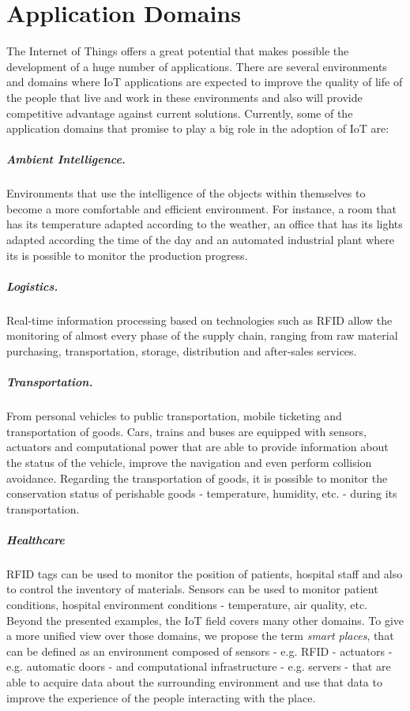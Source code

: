 \section{Application Domains}
\label{sec:application_domains}
The Internet of Things offers a great potential that makes possible the development of a huge number
of applications. There are several environments and domains where \gls{IoT} applications are expected
to improve the quality of life of the people that live and work in these environments and also
will provide competitive advantage against current solutions. Currently, some of the application
domains that promise to play a big role in the adoption of \gls{IoT} are:

\subparagraph{Ambient Intelligence.} Environments that use the intelligence of the objects within
themselves to become a more comfortable and efficient environment. For instance, a room that has its
temperature adapted according to the weather, an office that has its lights adapted according the time
of the day and an automated industrial plant where its is possible to monitor the production progress.
\subparagraph{Logistics.} Real-time information processing based on technologies such as \gls{RFID}
allow the monitoring of almost every phase of the supply chain, ranging from raw material
purchasing, transportation, storage, distribution and after-sales services.
\subparagraph{Transportation.} From personal vehicles to public transportation, mobile ticketing
and transportation of goods. Cars, trains and buses are equipped with sensors, actuators and computational
power that are able to provide information about the status of the vehicle, improve the navigation and
even perform collision avoidance. Regarding the transportation of goods, it is possible to monitor
the conservation status of perishable goods - temperature, humidity, etc. -  during its transportation.
\subparagraph{Healthcare} \gls{RFID} tags can be used to monitor the position of patients,
hospital staff and also to control the inventory of materials. Sensors can be used to monitor
patient conditions, hospital environment conditions - temperature, air quality, etc.\\

Beyond the presented examples, the \gls{IoT} field covers many other domains. To give a more unified
view over those domains, we propose the term \textit{smart places}, that can be defined as an environment
composed of sensors - e.g. RFID - actuators - e.g. automatic doors - and computational infrastructure
- e.g. servers - that are able to acquire data about the surrounding environment and use that data to
improve the experience of the people interacting with the place.

